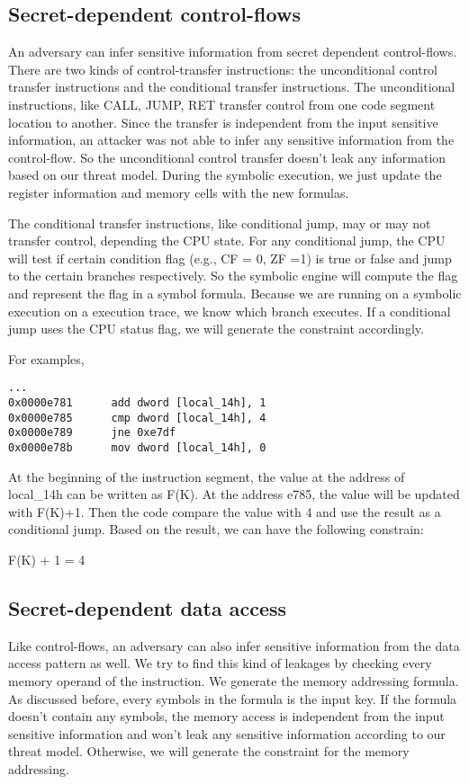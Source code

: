 \subsection{Secret-dependent control-flows}
An adversary can infer sensitive information from secret dependent control-flows. 
There are two kinds of control-transfer instructions: the unconditional control transfer instructions and the conditional transfer instructions. The unconditional instructions, like CALL, JUMP, RET transfer control from one code segment location to another. Since the transfer is independent from the input sensitive information, an attacker was not able to infer any sensitive information from the control-flow. So the unconditional control transfer doesn’t leak any information based on our threat model. During the symbolic execution, we just update the register information and memory cells with the new formulas.

The conditional transfer instructions, like conditional jump, may or may not transfer control, depending the CPU state. For any conditional jump, the CPU will test if certain condition flag (e.g., CF = 0, ZF =1) is true or false and jump to the certain branches respectively. So the symbolic engine will compute the flag and represent the flag in a symbol formula. Because we are running on a symbolic execution on a execution trace, we know which branch executes. If a conditional jump uses the CPU status flag, we will generate the constraint accordingly.

For examples,

\begin{lstlisting}
...
0x0000e781      add dword [local_14h], 1
0x0000e785      cmp dword [local_14h], 4
0x0000e789      jne 0xe7df
0x0000e78b      mov dword [local_14h], 0

\end{lstlisting}

At the beginning of the instruction segment, the value at the address of local_14h can be written as F(K). At the address e785, the value will be updated with F(K)+1. Then the code compare the value with 4 and use the result as a conditional jump. Based on the result, we can have the following constrain:

F(K) + 1 = 4
 
\subsection{Secret-dependent data access}
Like control-flows, an adversary can also infer sensitive information from the data access pattern as well. We try to find this kind of leakages by checking every memory operand of the instruction. We generate the memory addressing formula. As discussed before, every symbols in the formula is the input key. If the formula doesn’t contain any symbols, the memory access is independent from the input sensitive information and won’t leak any sensitive information according to our threat model. Otherwise, we will generate the constraint for the memory addressing. 


